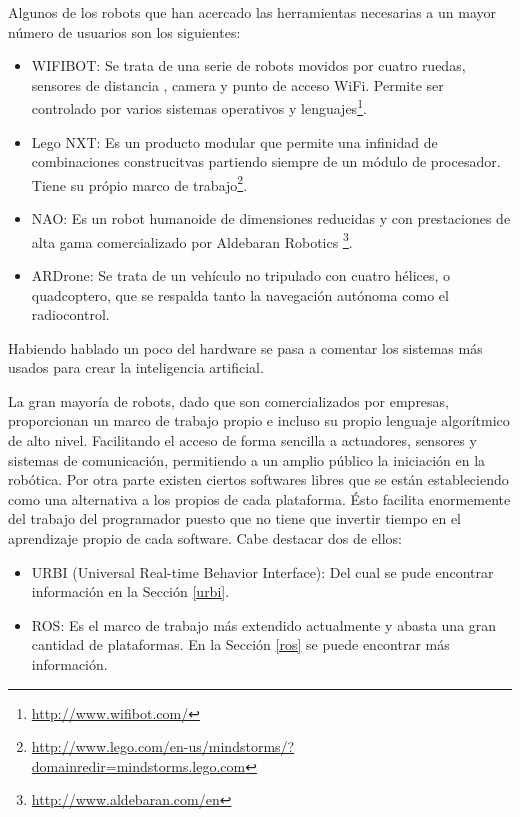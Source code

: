 \documentclass[12pt,a4paper,final,twoside]{book}
\begin{document}
Algunos de los robots que han acercado las herramientas necesarias a un mayor número de usuarios son los siguientes: 

\begin{itemize}
\item WIFIBOT: Se trata de una serie de robots movidos por cuatro ruedas, sensores de distancia , camera y punto de acceso WiFi. Permite ser controlado por varios sistemas operativos y lenguajes\footnote{\url{http://www.wifibot.com/}}.
\item Lego NXT: Es un producto modular que permite una infinidad de combinaciones construcitvas partiendo siempre de un módulo de procesador. Tiene su própio marco de trabajo\footnote{\url{http://www.lego.com/en-us/mindstorms/?domainredir=mindstorms.lego.com}}.
\item NAO: Es un robot humanoide de dimensiones reducidas y con prestaciones de alta gama comercializado por Aldebaran Robotics \footnote{\url{http://www.aldebaran.com/en}}.
\item ARDrone: Se trata de un vehículo no tripulado con cuatro hélices, o quadcoptero,  que se respalda tanto la navegación autónoma como el radiocontrol.
\end{itemize}

Habiendo hablado un poco del hardware se pasa a comentar los sistemas más usados para crear la inteligencia artificial.

La gran mayoría de robots, dado que son comercializados por empresas, proporcionan un marco de trabajo propio e incluso su propio lenguaje algorítmico de alto nivel. Facilitando el acceso de forma sencilla a actuadores, sensores y sistemas de comunicación, permitiendo a un amplio público la iniciación en la robótica.
Por otra parte existen ciertos softwares libres que se están estableciendo como una alternativa a los propios de cada plataforma.
Ésto facilita enormemente del trabajo del programador puesto que no tiene que invertir tiempo en el aprendizaje propio de cada software. 
Cabe destacar dos de ellos:

\begin{itemize}
\item URBI  (Universal Real-time Behavior Interface)\cite{urbiref}: Del cual se pude encontrar información en la Sección \ref{urbi}.
\item ROS: Es el marco de trabajo más extendido actualmente y abasta una gran cantidad de plataformas. En la Sección \ref{ros} se puede encontrar más información.
\end{itemize} 
\end{document}
